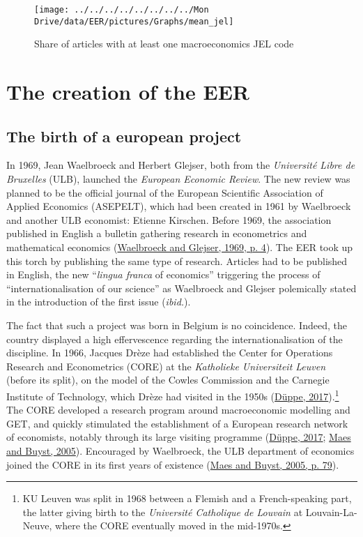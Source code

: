 \documentclass[
  12pt,
  onecolumn]{article}
\begin{document}
\begin{figure}[h]

{\centering \texttt{[image: ../../../../../../../../Mon Drive/data/EER/pictures/Graphs/mean\_jel]} 

}

\caption{Share of articles with at least one macroeconomics JEL code}\label{fig:plot-jel}
\end{figure}

\hypertarget{EER-creation}{%
\section{The creation of the EER}\label{EER-creation}}

\hypertarget{the-birth-of-a-european-project}{%
\subsection{The birth of a european
project}\label{the-birth-of-a-european-project}}

In 1969, Jean Waelbroeck and Herbert Glejser, both from the
\emph{Université Libre de Bruxelles} (ULB), launched the \emph{European
Economic Review}. The new review was planned to be the official journal
of the European Scientific Association of Applied Economics (ASEPELT),
which had been created in 1961 by Waelbroeck and another ULB economist:
Etienne Kirschen. Before 1969, the association published in English a
bulletin gathering research in econometrics and mathematical economics
(\protect\hyperlink{ref-waelbroeck1969}{Waelbroeck and Glejser, 1969, p.
4}). The EER took up this torch by publishing the same type of research.
Articles had to be published in English, the new ``\emph{lingua franca}
of economics'' triggering the process of ``internationalisation of our
science'' as Waelbroeck and Glejser polemically stated in the
introduction of the first issue (\emph{ibid.}).

The fact that such a project was born in Belgium is no coincidence.
Indeed, the country displayed a high effervescence regarding the
internationalisation of the discipline. In 1966, Jacques Drèze had
established the Center for Operations Research and Econometrics (CORE)
at the \emph{Katholieke Universiteit Leuven} (before its split), on the
model of the Cowles Commission and the Carnegie Institute of Technology,
which Drèze had visited in the 1950s
(\protect\hyperlink{ref-duppe2017}{Düppe, 2017}).\footnote{KU Leuven was
  split in 1968 between a Flemish and a French-speaking part, the latter
  giving birth to the \emph{Université Catholique de Louvain} at
  Louvain-La-Neuve, where the CORE eventually moved in the mid-1970s.}
The CORE developed a research program around macroeconomic modelling and
GET, and quickly stimulated the establishment of a European research
network of economists, notably through its large visiting programme
(\protect\hyperlink{ref-duppe2017}{Düppe, 2017};
\protect\hyperlink{ref-maes2005}{Maes and Buyst, 2005}). Encouraged by
Waelbroeck, the ULB department of economics joined the CORE in its first
years of existence (\protect\hyperlink{ref-maes2005}{Maes and Buyst,
2005, p. 79}).
\end{document}
